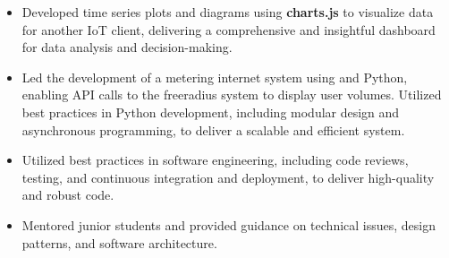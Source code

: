{\begin{itemize}
                  integrating  to display sensor locations and data.
                  Utilized best practices in frontend development, including responsive design and cross-browser compatibility, to deliver a high-quality and user-friendly experience.
            \item Developed time series plots and diagrams using \textbf{charts.js} to visualize data for another IoT client,
                  delivering a comprehensive and insightful dashboard for data analysis and decision-making.
            \item Led the development of a metering internet system using  and Python,
                  enabling API calls to the freeradius system to display user volumes.
                  Utilized best practices in Python development, including modular design and asynchronous programming,
                  to deliver a scalable and efficient system.
            \item Utilized best practices in software engineering, including code reviews, testing, and continuous
                  integration and deployment, to deliver high-quality and robust code.
            \item Mentored junior students and provided guidance on technical issues,
                  design patterns, and software architecture.
      \end{itemize}
}
